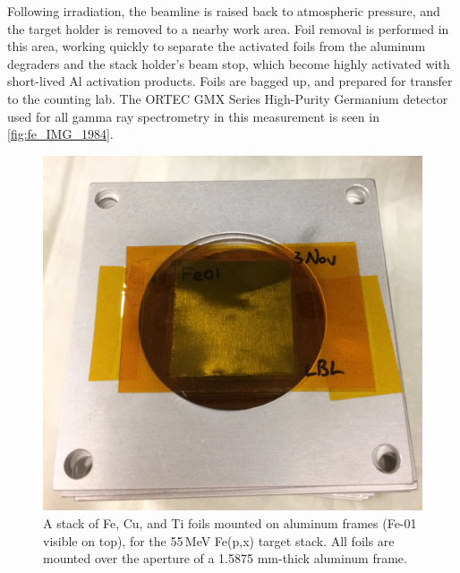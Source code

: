 Following irradiation, the beamline is raised back to atmospheric pressure, and the target holder is removed to a nearby work area.
Foil removal is performed in this area, working quickly to separate the activated foils from the aluminum degraders and the stack holder's beam stop, which
become highly activated with short-lived Al activation products.
Foils are bagged up, and prepared for transfer to the counting lab.
The ORTEC GMX Series  High-Purity Germanium  detector used for all gamma ray spectrometry  in this measurement is seen in \autoref{fig:fe_IMG_1984}.



\begin{figure}
 \centering
 \includegraphics[width=0.5\columnwidth]{./figures/IMG_0305.jpg}
 \caption{A stack of Fe, Cu, and Ti foils mounted on aluminum frames (Fe-01 visible on top), for the 55\,MeV Fe(p,x) target stack. All foils are mounted over the aperture of a 1.5875 mm-thick aluminum frame.}
 \label{fig:fe_IMG_0305}
\end{figure}




